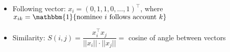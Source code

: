 \documentclass{slides}
\begin{document}
	\Large
	\begin{itemize}
		\item Following vector: $x_i = (0, 1, 1, 0, \ldots, 1)^\top$,
		where $x_{ik} = \mathbbm{1} \{\text{nominee $i$ follows account $k$}\}$
		\item Similarity: $S(i, j) = \dfrac{x_i^\top x_j} {||x_i|| \cdot ||x_j||} = $ cosine of angle between vectors
	\end{itemize}
\end{document}
